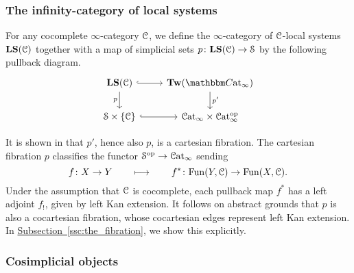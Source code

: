\documentclass[main.tex]{subfiles}
\begin{document}
\subsubsection{The infinity-category of local systems}
\label{sss:the_infinity_category_of_local_systems}


\begin{definition}
  For any cocomplete $\infty$-category $\mathcal{C}$, we define the $\infty$-category of $\mathcal{C}$-local systems $\mathbf{LS}(\mathcal{C})$ together with a map of simplicial sets $p\colon \mathbf{LS}(\mathcal{C}) \to \mathcal{S}$ by the following pullback diagram.
  \begin{equation}
    \label{eq:pullback_square_defining_local_systems}
    \begin{tikzcd}
      \LS(\category{C})
      \arrow[r, hook]
      \arrow[d, swap, "p"]
      & \Tw(\ICCat)
      \arrow[d, "p'"]
      \\
      \S \times \{\category{C}\}
      \arrow[r, hook]
      & \ICat \times \ICat\op
    \end{tikzcd}
  \end{equation}
\end{definition}

It is shown in \cite{garcia2020enhanced} that $p'$, hence also $p$, is a cartesian fibration. The cartesian fibration $p$ classifies the functor $\mathcal{S}^{\mathrm{op}} \to \mathcal{C}\mathrm{at}_{\infty}$ sending
\begin{equation*}
  f\colon X \to Y \qquad \longmapsto \qquad f^{*}\colon \mathrm{Fun}(Y, \mathcal{C}) \to \mathrm{Fun}(X, \mathcal{C}).
\end{equation*}
Under the assumption that $\mathcal{C}$ is cocomplete, each pullback map $f^{*}$ has a left adjoint $f_{!}$, given by left Kan extension. It follows on abstract grounds that $p$ is also a cocartesian fibration, whose cocartesian edges represent left Kan extension. In \hyperref[ssc:the_fibration]{Subsection~\ref*{ssc:the_fibration}}, we show this explicitly.

\subsubsection{Cosimplicial objects}
\label{sss:cosimplicial_objects}
\end{document}
